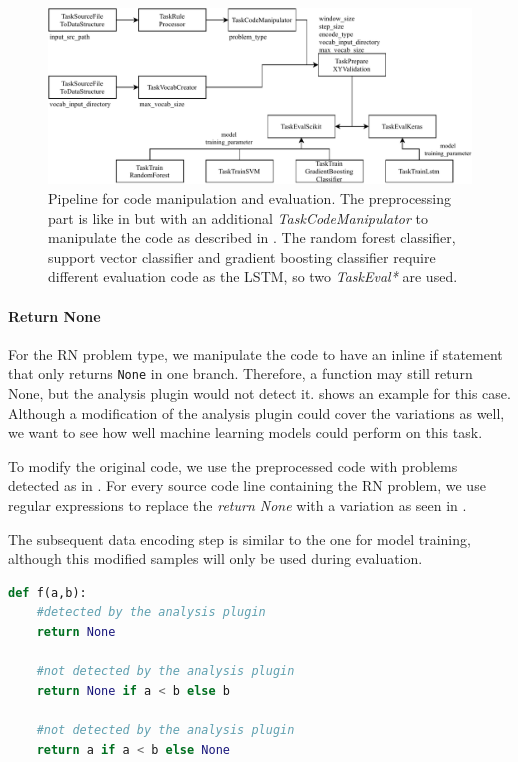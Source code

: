 \begin{figure}
    \includegraphics[width=1\textwidth]{img/ML/Pipeline_RQ3.pdf}
    \caption{Pipeline for code manipulation and evaluation. The preprocessing part is like in  but with an additional \textit{TaskCodeManipulator} to manipulate the code as described in . The random forest classifier, support vector classifier and gradient boosting classifier require different evaluation code as the LSTM, so two \textit{TaskEval*} are used.}
    \label{fig:pipeline_RQ3}
\end{figure}


\paragraph{Return None}\label{par:manipulation_return_none}
For the RN problem type, we manipulate the code to have an inline if statement that only returns \texttt{None} in one branch. Therefore, a function may still return None, but the analysis plugin would not detect it.  shows an example for this case. Although a modification of the analysis plugin could cover the variations as well, we want to see how well machine learning models could perform on this task.

To modify the original code, we use the preprocessed code with problems detected as in . For every source code line containing the RN problem, we use regular expressions to replace the \textit{return None} with a variation as seen in . 

The subsequent data encoding step is similar to the one for model training, although this modified samples will only be used during evaluation.

\begin{lstlisting}[float=t, language=Python, label=lst:return_none_modified, caption={Samples for returning None. The analysis plugin would flag the first return; the second and third return are modified variations that would be ignored by the analysis plugin. The performance of the machine learning models on detecting the latter will be evaluated.}]
def f(a,b):
    #detected by the analysis plugin
    return None 

    #not detected by the analysis plugin
    return None if a < b else b 

    #not detected by the analysis plugin
    return a if a < b else None \end{lstlisting}

